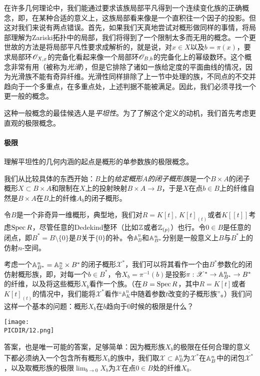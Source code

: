 在许多几何理论中，我们能通过要求该族局部平凡得到一个连续变化族的正确概念，即，在某种合适的意义上，这族局部看来像是一个直积往一个因子的投影。但这对我们来说有两点错误。首先，如果我们天真地尝试对概形做同样的事情，将局部理解为Zariski拓扑中的局部，我们将得到了一个限制太多而无用的概念。一个更世故的方法是将局部平凡性要求成解析的，就是说，对$x\in X$以及$b=\pi(x)$，要求局部环$\mathscr{O}_{X,x}$的完备化看起来像一个局部环$\mathscr{O}_{B,b}$的完备化上的幂级数环。这个概念非常有用（被称为\textit{光滑}），但是它排除了诸如一族给定度的平面曲线的情况，因为光滑族不能有奇异纤维。光滑性同样排除了上一节中处理的族，不同点的不交并趋向于一个多重点，在多重点处，上述判据不能被满足。因此，我们必须寻找一个更一般的概念。

这种一般概念的最佳候选人是\textit{平坦性}。为了了解这个定义的动机，我们首先考虑更直观的极限概念。

\paragraph*{极限}
理解平坦性的几何内涵的起点是概形的单参数族的极限概念。

我们从比较具体的东西开始：$B$上的\textit{给定概形$A$的闭子概形族}是一个$B\times A$的闭子概形$X\subset B\times A$和限制在$X$上的投射映射$B\times A\to B$，于是$X$在点$b\in B$上的纤维自然是$B\times A$在$B$上的纤维$A_b$的闭子概形。

令$B$是一个非奇异一维概形，典型地，我们对$R=K[t]$, $K[t]_{(t)}$或者$K[\![t]\!]$考虑$\operatorname{Spec} R$，尽管任意的Dedekind整环（比如$\mathbb{Z}$或者$\mathbb{Z}_{(p)}$）也行。令$0\in B$是任意的闭点，即$B^*=B\setminus \{0\}$是$B$关于$\{0\}$的补。令$\mathbb{A}_B^n$和$\mathbb{A}_{B^*}^n$分别是一般意义上$B$与$B^*$上的仿射$n$-空间。

考虑一个$\mathbb{A}_{B^*}^n=\mathbb{A}_{\mathbb{Z}}^n\times B^*$的闭子概形$\mathscr{X}^*$，我们可以将其看作一个由$B^*$参数化的闭仿射概形族，即，对每一个$b\in B^*$，令$X_b=\pi^{-1}(b)$是投影$\pi:\mathscr{X}^*\to \mathbb{A}_{B^*}^n\to B^*$的纤维，以及将这些概形$X_b$看作一个族。（在$B=\operatorname{Spec} R$，其中$R=K[t]$或者$K[t]_{(t)}$的情况中，我们能将$\mathscr{X}^*$看作“$\mathbb{A}_K^n$中随着参数$t$改变的子概形族”。）我们问这样一个基本的问题：概形$X_b$在$b$趋向于$0$时候的极限是什么？

\begin{center}\texttt{[image: \\PICDIR/12.png]}\end{center}

答案，也是唯一可能的答案，足够简单：因为概形族$X_b$的极限在任何合理的意义下都必须纳入一个包含所有概形$X_b$的族中，我们取$\mathscr{X}\subset \mathbb{A}_B^n$为$\mathscr{X}^*$在$\mathbb{A}_B^n$中的闭包$\overline{\mathscr{X}^*}$，以及取概形族的极限$\lim_{b\to 0}X_b$为$\mathscr{X}$在点$0\in B$处的纤维$X_0$.

